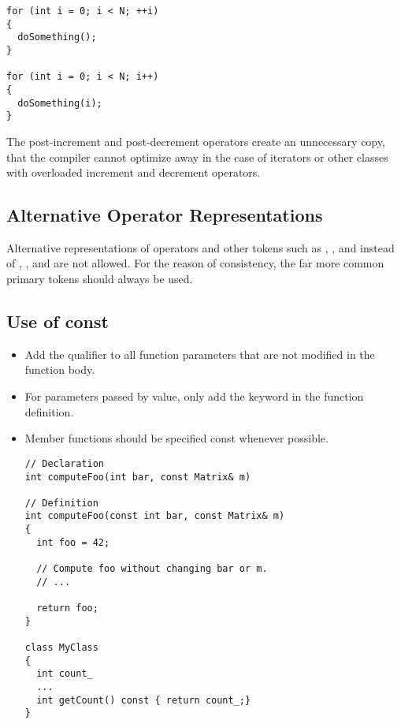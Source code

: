 \begin{lstlisting}[showspaces=false]
for (int i = 0; i < N; ++i)
{
  doSomething();
}

for (int i = 0; i < N; i++)
{
  doSomething(i);
}
\end{lstlisting}

The post-increment and post-decrement operators create an unnecessary copy, that the compiler cannot optimize away in the case of iterators or other classes with overloaded increment and decrement operators.

\subsection{Alternative Operator Representations}
Alternative representations of operators and other tokens such as , , and  instead of \inlinecode{&&}, \inlinecode{||}, and \inlinecode{!} are not allowed.
For the reason of consistency, the far more common primary tokens should always be used.

\subsection{Use of const}
\begin{itemize}
\item Add the  qualifier to all function parameters that are not modified in the function body.
\item For parameters passed by value, only add the keyword in the function definition.
\item Member functions should be specified const whenever possible.

\begin{lstlisting}[showspaces=false]
// Declaration
int computeFoo(int bar, const Matrix& m)

// Definition
int computeFoo(const int bar, const Matrix& m)
{
  int foo = 42;

  // Compute foo without changing bar or m.
  // ...

  return foo;
}

class MyClass
{
  int count_
  ...
  int getCount() const { return count_;}
}
\end{lstlisting}

\end{itemize}

